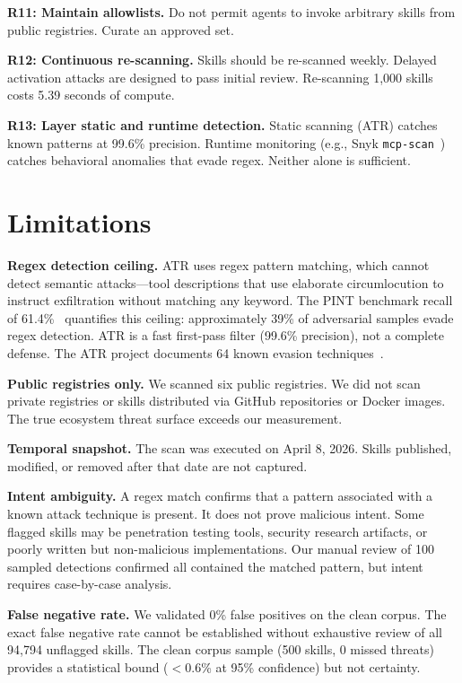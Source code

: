 \documentclass[letterpaper,twocolumn,10pt]{article}
\begin{document}
\textbf{R11: Maintain allowlists.}  Do not permit agents to invoke
arbitrary skills from public registries.  Curate an approved set.

\textbf{R12: Continuous re-scanning.}  Skills should be re-scanned
weekly.  Delayed activation attacks are designed to pass initial review.
Re-scanning 1,000 skills costs 5.39 seconds of compute.

\textbf{R13: Layer static and runtime detection.}  Static scanning (ATR)
catches known patterns at 99.6\% precision.  Runtime monitoring (e.g.,
Snyk \texttt{mcp-scan}~\cite{snyk2026}) catches behavioral anomalies
that evade regex.  Neither alone is sufficient.

\section{Limitations}
\label{sec:limitations}

\textbf{Regex detection ceiling.}  ATR uses regex pattern matching,
which cannot detect semantic attacks---tool descriptions that use
elaborate circumlocution to instruct exfiltration without matching any
keyword.  The PINT benchmark recall of 61.4\%~\cite{pint} quantifies
this ceiling: approximately 39\% of adversarial samples evade regex
detection.  ATR is a fast first-pass filter (99.6\% precision), not a
complete defense.  The ATR project documents 64 known evasion
techniques~\cite{atr}.

\textbf{Public registries only.}  We scanned six public registries.  We
did not scan private registries or skills distributed via GitHub
repositories or Docker images.  The true ecosystem threat surface
exceeds our measurement.

\textbf{Temporal snapshot.}  The scan was executed on April 8, 2026.
Skills published, modified, or removed after that date are not captured.

\textbf{Intent ambiguity.}  A regex match confirms that a pattern
associated with a known attack technique is present.  It does not prove
malicious intent.  Some flagged skills may be penetration testing tools,
security research artifacts, or poorly written but non-malicious
implementations.  Our manual review of 100 sampled detections confirmed
all contained the matched pattern, but intent requires case-by-case
analysis.

\textbf{False negative rate.}  We validated 0\% false positives on the
clean corpus.  The exact false negative rate cannot be established
without exhaustive review of all 94,794 unflagged skills.  The clean
corpus sample (500 skills, 0 missed threats) provides a statistical
bound ($<$0.6\% at 95\% confidence) but not certainty.
\end{document}
